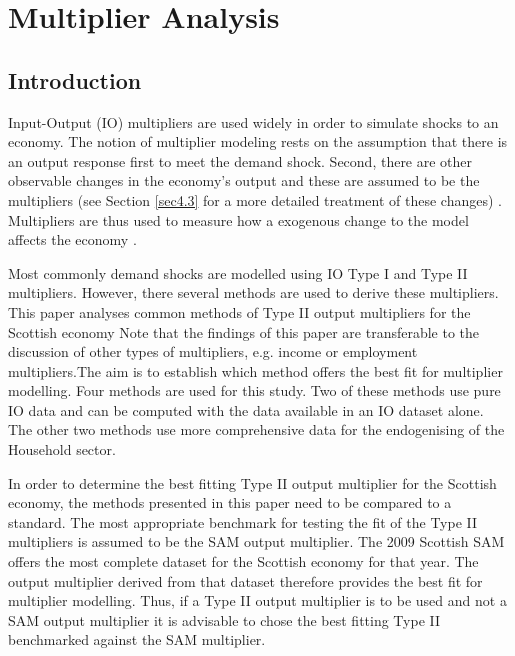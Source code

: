 \chapter{Multiplier Analysis}
\label{Chapter4}

\begin{doublespacing}

\section{Introduction}
\label{sec:4.1}

Input-Output (IO) multipliers are used widely in order to simulate shocks to an economy. The notion of multiplier modeling rests on the assumption that there is an output response first to meet the demand shock. Second, there are other observable changes in the economy's output and these are assumed to be the multipliers (see Section \ref{sec4.3} for a more detailed treatment of these changes) \cite{Miller2009}. Multipliers are thus used to measure how a exogenous change to the model affects the economy \cite{Miller2009}.

\bigskip

Most commonly demand shocks are modelled using IO Type I and Type II multipliers. However, there several methods are used to derive these multipliers. This paper analyses common methods of Type II output multipliers for the Scottish economy Note that the findings of this paper are transferable to the discussion of other types of multipliers, e.g. income or employment multipliers.The aim is to establish which method offers the best fit for multiplier modelling. Four methods are used for this study. Two of these methods use pure IO data and can be computed with the data available in an IO dataset alone. The other two methods use more comprehensive data for the endogenising of the Household sector.

\bigskip

In order to determine the best fitting Type II output multiplier for the Scottish economy, the methods presented in this paper need to be compared to a standard. The most appropriate benchmark for testing the fit of the Type II multipliers is assumed to be the SAM output multiplier. The 2009 Scottish SAM  offers the most complete dataset for the Scottish economy for that year. The output multiplier derived from that dataset therefore provides the best fit for multiplier modelling. Thus, if a Type II output multiplier is to be used and not a SAM output multiplier it is advisable to chose the best fitting Type II benchmarked against the SAM multiplier.


\end{doublespacing}
